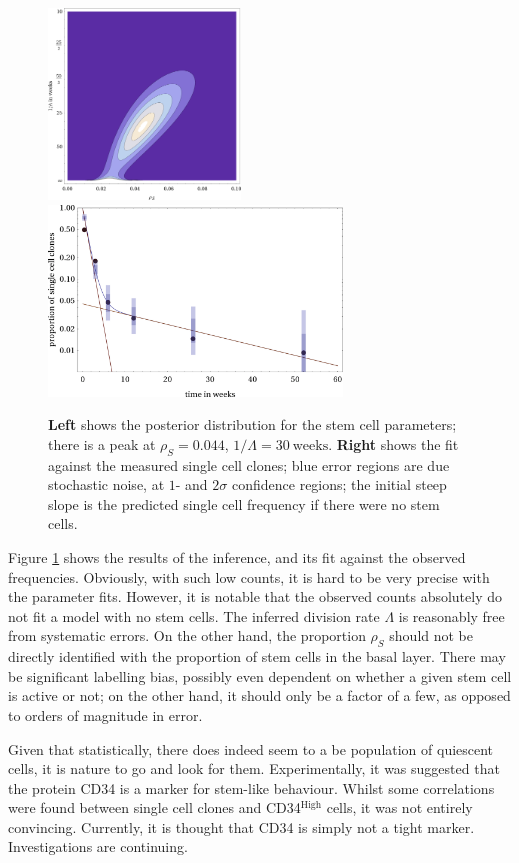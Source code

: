\documentclass[10pt,english]{report}
\begin{document}
\begin{figure}[htb]
	\centering
	\hfill\includegraphics[height=2in]{single-cell-inference.png}\hfill\includegraphics[height=2in]{single-cell-clones.png}\hfill~
	\caption{\label{fig:oes-stem-parameters}\textbf{Left} shows the posterior distribution for the stem cell parameters; there is a peak at $\rho_S = 0.044$, $1/\Lambda = 30~\textrm{weeks}$. \textbf{Right} shows the fit against the measured single cell clones; blue error regions are due stochastic noise, at $1$- and $2\sigma$ confidence regions; the initial steep slope is the predicted single cell frequency if there were no stem cells. }
\end{figure}

Figure \ref{fig:oes-stem-parameters} shows the results of the inference, and its fit against the observed frequencies. Obviously, with such low counts, it is hard to be very precise with the parameter fits. However, it is notable that the observed counts absolutely do not fit a model with no stem cells. The inferred division rate $\Lambda$ is reasonably free from systematic errors. On the other hand, the proportion $\rho_S$ should not be directly identified with the proportion of stem cells in the basal layer. There may be significant labelling bias, possibly even dependent on whether a given stem cell is active or not; on the other hand, it should only be a factor of a few, as opposed to orders of magnitude in error.

Given that statistically, there does indeed seem to a be population of quiescent cells, it is nature to go and look for them. Experimentally, it was suggested that the protein CD34 is a marker for stem-like behaviour. Whilst some correlations were found between single cell clones and CD34$^\textrm{High}$ cells, it was not entirely convincing. Currently, it is thought that CD34 is simply not a tight marker. Investigations are continuing.
\end{document}
